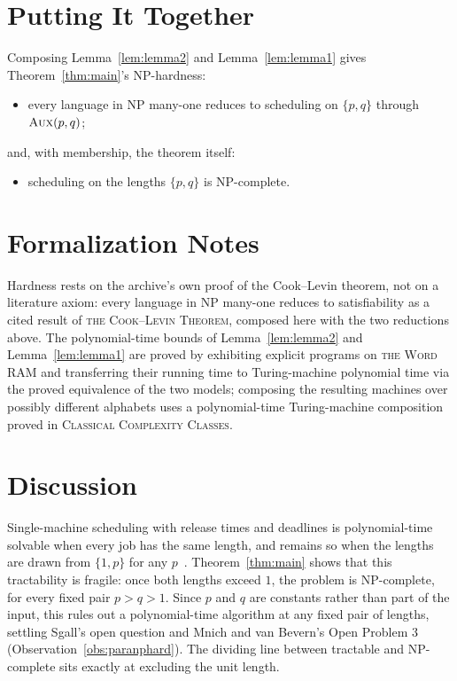 \documentclass[11pt,a4paper]{article}
\theoremstyle{definition}
\newcommand{\AUX}{\textsc{Aux}}
\newcommand{\NP}{\textnormal{\textsf{NP}}}
\begin{document}
\section{Putting It Together}

Composing Lemma~\ref{lem:lemma2} and Lemma~\ref{lem:lemma1} gives Theorem~\ref{thm:main}'s
NP-hardness:
\begin{itemize}
\item %
every language in \NP{} many-one reduces to scheduling on $\{p,q\}$ through
$\AUX(p,q)$;
\end{itemize}
and, with membership, the theorem itself:
\begin{itemize}
\item %
scheduling on the lengths $\{p,q\}$ is \NP-complete.
\end{itemize}

\section{Formalization Notes}

Hardness rests on the archive's own proof of the Cook--Levin theorem, not on
a literature axiom: every language in \NP{} many-one reduces to
satisfiability as a cited result of
\textsc{the Cook--Levin Theorem},
composed here with the two reductions above. The polynomial-time bounds of
Lemma~\ref{lem:lemma2} and Lemma~\ref{lem:lemma1} are proved by exhibiting explicit
programs on
\textsc{the Word RAM}
and transferring their running time to Turing-machine polynomial time via
the proved equivalence of the two models;
composing the resulting machines over possibly different alphabets uses a
polynomial-time Turing-machine composition proved in
\textsc{Classical Complexity Classes}.

\section{Discussion}

Single-machine scheduling with release times and deadlines is
polynomial-time solvable when every job has the same length, and remains so
when the lengths are drawn from $\{1,p\}$ for any $p$~\cite{Sgall12}.
Theorem~\ref{thm:main} shows that this tractability is fragile: once both lengths
exceed $1$, the problem is \NP-complete, for every fixed pair $p>q>1$. Since
$p$ and $q$ are constants rather than part of the input, this rules out a
polynomial-time algorithm at any fixed pair of lengths, settling Sgall's
open question and Mnich and van Bevern's Open Problem 3
(Observation~\ref{obs:paranphard}). The dividing line between tractable and
\NP-complete sits exactly at excluding the unit length.
\end{document}
